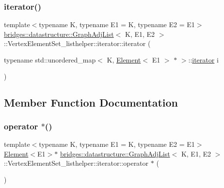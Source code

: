 \subsubsection{\texorpdfstring{iterator()}{iterator()}}
{\footnotesize\ttfamily template$<$typename K, typename E1 = K, typename E2 = E1$>$ \\
\mbox{\hyperlink{classbridges_1_1datastructure_1_1_graph_adj_list}{bridges\+::datastructure\+::\+Graph\+Adj\+List}}$<$ K, E1, E2 $>$\+::Vertex\+Element\+Set\+\_\+listhelper\+::iterator\+::iterator (\begin{DoxyParamCaption}\item[{typename std\+::unordered\+\_\+map$<$ K, \mbox{\hyperlink{classbridges_1_1datastructure_1_1_element}{Element}}$<$ E1 $>$ $\ast$ $>$\+::\mbox{\hyperlink{classbridges_1_1datastructure_1_1_graph_adj_list_1_1_vertex_element_set__listhelper_1_1iterator}{iterator}}}]{i }\end{DoxyParamCaption})\hspace{0.3cm}{\ttfamily [inline]}}



\subsection{Member Function Documentation}
\mbox{\label{classbridges_1_1datastructure_1_1_graph_adj_list_1_1_vertex_element_set__listhelper_1_1iterator_a7eba15c3cd40ebc081cfc3b69a4e5907}} 
\subsubsection{\texorpdfstring{operator $\ast$()}{operator *()}}
{\footnotesize\ttfamily template$<$typename K, typename E1 = K, typename E2 = E1$>$ \\
\mbox{\hyperlink{classbridges_1_1datastructure_1_1_element}{Element}}$<$E1$>$$\ast$ \mbox{\hyperlink{classbridges_1_1datastructure_1_1_graph_adj_list}{bridges\+::datastructure\+::\+Graph\+Adj\+List}}$<$ K, E1, E2 $>$\+::Vertex\+Element\+Set\+\_\+listhelper\+::iterator\+::operator $\ast$ (\begin{DoxyParamCaption}{ }\end{DoxyParamCaption})\hspace{0.3cm}{\ttfamily [inline]}}

